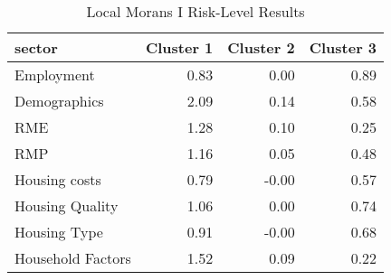 \begin{table}[ht]
    \centering
    \caption{Local Morans I Risk-Level Results}
    \label{tab:local_moran}
    \begin{tabular}{|l|r|r|r|}
      \hline
    sector & Cluster 1 & Cluster 2 & Cluster 3 \\ 
      \hline
    Employment & 0.83 & 0.00 & 0.89 \\ 
    \hline
      Demographics & 2.09 & 0.14 & 0.58 \\ 
      \hline
      RME & 1.28 & 0.10 & 0.25 \\ 
      \hline
      RMP & 1.16 & 0.05 & 0.48 \\ 
      \hline
      Housing costs & 0.79 & -0.00 & 0.57 \\ 
      \hline
      Housing Quality & 1.06 & 0.00 & 0.74 \\ 
      \hline
      Housing Type & 0.91 & -0.00 & 0.68 \\ 
      \hline
      Household Factors & 1.52 & 0.09 & 0.22 \\ 
       \hline
    \end{tabular}
    \end{table}